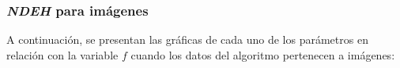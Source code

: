 \subsubsection{\emph{NDEH} para imágenes}

	A continuación, se presentan las gráficas de cada uno de los
parámetros en relación con la variable $f$ cuando los datos
del algoritmo pertenecen a imágenes:

\begin{figure}[H]
  \centering
  \label{fig:f_de1}
\end{figure}


